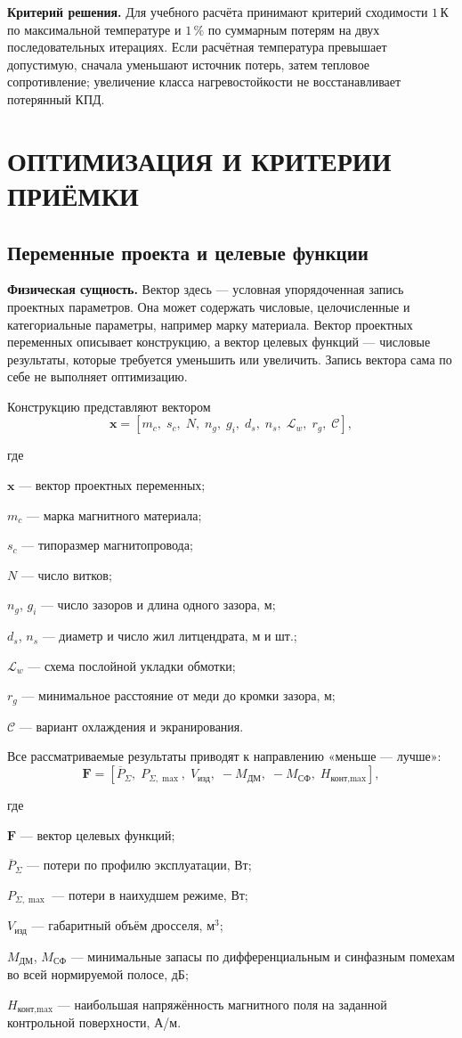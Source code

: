 \documentclass[14pt,a4paper]{extarticle}
\newcommand{\phys}{\par\noindent\textbf{Физическая сущность.} }
\newcommand{\criterion}{\par\noindent\textbf{Критерий решения.} }
\newenvironment{whereblock}
 {\par\noindent где\par
  \begin{list}{}{\setlength{\leftmargin}{12.5mm}
                  \setlength{\itemindent}{-12.5mm}
                  \setlength{\itemsep}{0pt}
                  \setlength{\parsep}{0pt}
                  \setlength{\topsep}{0pt}}}
 {\end{list}}
\newcommand{\whereitem}[2]{\item[] #1 --- #2}
\begin{document}
\criterion Для учебного расчёта принимают критерий сходимости
$1\,\text{К}$ по максимальной температуре и $1\,\%$ по суммарным потерям на
двух последовательных итерациях. Если расчётная температура превышает
допустимую, сначала уменьшают источник потерь, затем тепловое сопротивление;
увеличение класса нагревостойкости не восстанавливает потерянный КПД.

\section{ОПТИМИЗАЦИЯ И КРИТЕРИИ ПРИЁМКИ}
\label{sec:optimization}

\subsection{Переменные проекта и целевые функции}

\phys Вектор здесь --- условная упорядоченная запись проектных параметров.
Она может содержать числовые, целочисленные и категориальные параметры,
например марку материала. Вектор проектных переменных описывает конструкцию,
а вектор целевых функций --- числовые результаты, которые требуется
уменьшить или увеличить. Запись вектора сама по себе не выполняет
оптимизацию.

Конструкцию представляют вектором
\begin{equation}
 \mathbf x=
 [m_c,\;s_c,\;N,\;n_g,\;g_i,\;d_s,\;n_s,\;
 \mathcal L_w,\;r_g,\;\mathcal C],
 \label{eq:design-vector}
\end{equation}
\begin{whereblock}
\whereitem{$\mathbf x$}{вектор проектных переменных;}
\whereitem{$m_c$}{марка магнитного материала;}
\whereitem{$s_c$}{типоразмер магнитопровода;}
\whereitem{$N$}{число витков;}
\whereitem{$n_g$, $g_i$}{число зазоров и длина одного зазора, м;}
\whereitem{$d_s$, $n_s$}{диаметр и число жил литцендрата, м и шт.;}
\whereitem{$\mathcal L_w$}{схема послойной укладки обмотки;}
\whereitem{$r_g$}{минимальное расстояние от меди до кромки зазора, м;}
\whereitem{$\mathcal C$}{вариант охлаждения и экранирования.}
\end{whereblock}

Все рассматриваемые результаты приводят к направлению «меньше --- лучше»:
\begin{equation}
 \mathbf F=
 \left[
 \overline P_{\Sigma},\;
 P_{\Sigma,\max},\;
 V_{\text{изд}},\;
 -M_{\text{ДМ}},\;
 -M_{\text{СФ}},\;
 H_{\text{конт,max}}
 \right],
 \label{eq:objective-vector}
\end{equation}
\begin{whereblock}
\whereitem{$\mathbf F$}{вектор целевых функций;}
\whereitem{$\overline P_{\Sigma}$}{потери по профилю эксплуатации,
Вт;}
\whereitem{$P_{\Sigma,\max}$}{потери в наихудшем режиме, Вт;}
\whereitem{$V_{\text{изд}}$}{габаритный объём дросселя, м$^3$;}
\whereitem{$M_{\text{ДМ}}$, $M_{\text{СФ}}$}{минимальные запасы по
дифференциальным и синфазным помехам во всей нормируемой полосе, дБ;}
\whereitem{$H_{\text{конт,max}}$}{наибольшая напряжённость магнитного поля
на заданной контрольной поверхности, А/м.}
\end{whereblock}
\end{document}
